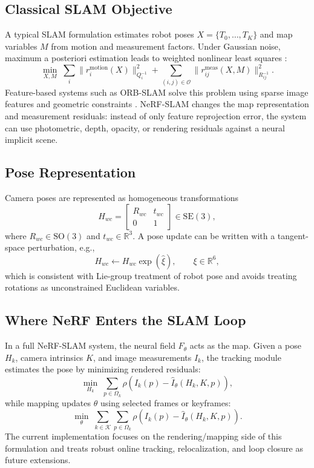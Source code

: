 \documentclass[conference]{IEEEtran}
\newcommand{\R}{\mathbb{R}}
\newcommand{\SE}{\mathrm{SE}}
\newcommand{\SO}{\mathrm{SO}}
\begin{document}
\subsection{Classical SLAM Objective}
A typical SLAM formulation estimates robot poses $X=\{T_0,\ldots,T_K\}$ and map variables $M$ from motion and measurement factors. Under Gaussian noise, maximum a posteriori estimation leads to weighted nonlinear least squares \cite{thrun2005probabilistic,barfoot2017state}:
\begin{equation}
\min_{X,M}\;\sum_i \|r_i^{\mathrm{motion}}(X)\|_{Q_i^{-1}}^2 + \sum_{(i,j)\in\mathcal{O}} \|r_{ij}^{\mathrm{meas}}(X,M)\|_{R_{ij}^{-1}}^2 .
\label{eq:slam-objective}
\end{equation}
Feature-based systems such as ORB-SLAM solve this problem using sparse image features and geometric constraints \cite{mur2015orb}. NeRF-SLAM changes the map representation and measurement residuals: instead of only feature reprojection error, the system can use photometric, depth, opacity, or rendering residuals against a neural implicit scene.

\subsection{Pose Representation}
Camera poses are represented as homogeneous transformations
\begin{equation}
H_{wc}=\begin{bmatrix}R_{wc} & t_{wc}\\0 & 1\end{bmatrix}\in \SE(3),
\end{equation}
where $R_{wc}\in\SO(3)$ and $t_{wc}\in\R^3$. A pose update can be written with a tangent-space perturbation, e.g.,
\begin{equation}
H_{wc}\leftarrow H_{wc}\exp(\widehat{\xi}), \qquad \xi\in\R^6,
\label{eq:pose-update}
\end{equation}
which is consistent with Lie-group treatment of robot pose and avoids treating rotations as unconstrained Euclidean variables.

\subsection{Where NeRF Enters the SLAM Loop}
In a full NeRF-SLAM system, the neural field $F_\theta$ acts as the map. Given a pose $H_k$, camera intrinsics $K$, and image measurements $I_k$, the tracking module estimates the pose by minimizing rendered residuals:
\begin{equation}
\min_{H_k}\;\sum_{p\in\Omega_k}\rho\left(I_k(p)-\widehat{I}_\theta(H_k,K,p)\right),
\label{eq:tracking}
\end{equation}
while mapping updates $\theta$ using selected frames or keyframes:
\begin{equation}
\min_{\theta}\;\sum_{k\in\mathcal{K}}\sum_{p\in\Omega_k}\rho\left(I_k(p)-\widehat{I}_\theta(H_k,K,p)\right).
\label{eq:mapping}
\end{equation}
The current implementation focuses on the rendering/mapping side of this formulation and treats robust online tracking, relocalization, and loop closure as future extensions.
\end{document}
